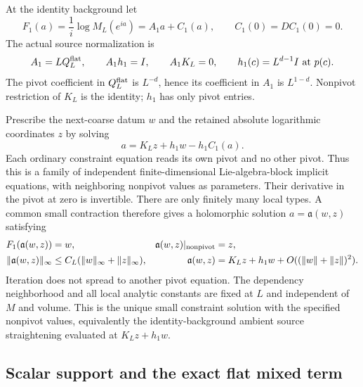\documentclass[11pt]{article}
\theoremstyle{remark}\newtheorem{remark}[theorem]{Remark}
\begin{document}
At the identity background let
\begin{equation}
 F_1(a)=\frac1i\log M_L(e^{ia})=A_1a+C_1(a),\qquad
 C_1(0)=DC_1(0)=0.                                           \label{st-constraint}
\end{equation}
The actual source normalization is
\begin{equation}
 A_1=LQ_L^{\rm flat},\qquad A_1h_1=I,\qquad A_1K_L=0,
 \qquad h_1(c)=L^{d-1}I\text{ at }p(c).                       \label{st-pivot-normalization}
\end{equation}
The pivot coefficient in $Q_L^{\rm flat}$ is $L^{-d}$, hence its
coefficient in $A_1$ is $L^{1-d}$. Nonpivot restriction of $K_L$ is the
identity; $h_1$ has only pivot entries.

Prescribe the next-coarse datum $w$ and the retained absolute logarithmic
coordinates $z$ by solving
\begin{equation}
 a=K_Lz+h_1w-h_1C_1(a).                                     \label{st-affine-equation}
\end{equation}
Each ordinary constraint equation reads its own pivot and no other
pivot. Thus this is a family of independent finite-dimensional
Lie-algebra-block implicit equations, with neighboring nonpivot values
as parameters. Their derivative in the pivot at zero is invertible.
There are only finitely many local types. A common small contraction
therefore gives a holomorphic solution $a=\mathfrak a(w,z)$ satisfying
\begin{align}
 F_1(\mathfrak a(w,z))&=w,&
 \mathfrak a(w,z)|_{\rm nonpivot}&=z,\notag\\
 \|\mathfrak a(w,z)\|_\infty
    &\le C_L(\|w\|_\infty+\|z\|_\infty),&
 \mathfrak a(w,z)&=K_Lz+h_1w+O((\|w\|+\|z\|)^2).
                                                               \label{st-affine-bounds}
\end{align}
Iteration does not spread to another pivot equation. The dependency
neighborhood and all local analytic constants are fixed at $L$ and
independent of $M$ and volume. This is the unique small constraint
solution with the specified nonpivot values, equivalently the
identity-background ambient source straightening evaluated at
$K_Lz+h_1w$.

\subsection{Scalar support and the exact flat mixed term}
\label{st-scalar-section}
\end{document}
